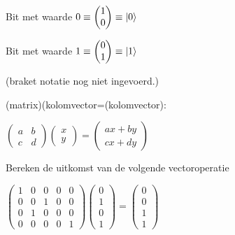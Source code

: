 \documentclass[../../main.tex]{subfiles}
\begin{document}
Bit met waarde $0 \equiv \begin{pmatrix}
1\\
0
\end{pmatrix}
\equiv
\ket{0}$

Bit met waarde $1 \equiv 
\begin{pmatrix}
0\\
1
\end{pmatrix}
\equiv
\ket{1}$


(braket notatie nog niet ingevoerd.)

(matrix)(kolomvector=(kolomvector):

$
\begin{pmatrix}
a&b\\
c&d
\end{pmatrix}
\begin{pmatrix}
x\\
y
\end{pmatrix}
=
\begin{pmatrix}
ax+by\\
cx+dy
\end{pmatrix}
$

\easy Bereken de uitkomst van de volgende vectoroperatie

$
\begin{pmatrix}
1&0&0&0&0\\
0&0&1&0&0\\
0&1&0&0&0\\
0&0&0&0&1
\end{pmatrix}
\begin{pmatrix}
0\\
1\\
0\\
1
\end{pmatrix}
=
\begin{pmatrix}
0\\
0\\
1\\
1
\end{pmatrix}
$
\end{document}
